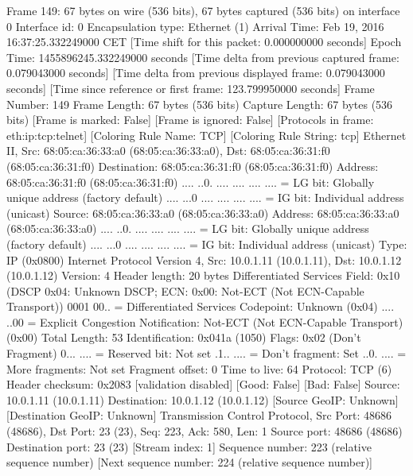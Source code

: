 Frame 149: 67 bytes on wire (536 bits), 67 bytes captured (536 bits) on interface 0
    Interface id: 0
    Encapsulation type: Ethernet (1)
    Arrival Time: Feb 19, 2016 16:37:25.332249000 CET
    [Time shift for this packet: 0.000000000 seconds]
    Epoch Time: 1455896245.332249000 seconds
    [Time delta from previous captured frame: 0.079043000 seconds]
    [Time delta from previous displayed frame: 0.079043000 seconds]
    [Time since reference or first frame: 123.799950000 seconds]
    Frame Number: 149
    Frame Length: 67 bytes (536 bits)
    Capture Length: 67 bytes (536 bits)
    [Frame is marked: False]
    [Frame is ignored: False]
    [Protocols in frame: eth:ip:tcp:telnet]
    [Coloring Rule Name: TCP]
    [Coloring Rule String: tcp]
Ethernet II, Src: 68:05:ca:36:33:a0 (68:05:ca:36:33:a0), Dst: 68:05:ca:36:31:f0 (68:05:ca:36:31:f0)
    Destination: 68:05:ca:36:31:f0 (68:05:ca:36:31:f0)
        Address: 68:05:ca:36:31:f0 (68:05:ca:36:31:f0)
        .... ..0. .... .... .... .... = LG bit: Globally unique address (factory default)
        .... ...0 .... .... .... .... = IG bit: Individual address (unicast)
    Source: 68:05:ca:36:33:a0 (68:05:ca:36:33:a0)
        Address: 68:05:ca:36:33:a0 (68:05:ca:36:33:a0)
        .... ..0. .... .... .... .... = LG bit: Globally unique address (factory default)
        .... ...0 .... .... .... .... = IG bit: Individual address (unicast)
    Type: IP (0x0800)
Internet Protocol Version 4, Src: 10.0.1.11 (10.0.1.11), Dst: 10.0.1.12 (10.0.1.12)
    Version: 4
    Header length: 20 bytes
    Differentiated Services Field: 0x10 (DSCP 0x04: Unknown DSCP; ECN: 0x00: Not-ECT (Not ECN-Capable Transport))
        0001 00.. = Differentiated Services Codepoint: Unknown (0x04)
        .... ..00 = Explicit Congestion Notification: Not-ECT (Not ECN-Capable Transport) (0x00)
    Total Length: 53
    Identification: 0x041a (1050)
    Flags: 0x02 (Don't Fragment)
        0... .... = Reserved bit: Not set
        .1.. .... = Don't fragment: Set
        ..0. .... = More fragments: Not set
    Fragment offset: 0
    Time to live: 64
    Protocol: TCP (6)
    Header checksum: 0x2083 [validation disabled]
        [Good: False]
        [Bad: False]
    Source: 10.0.1.11 (10.0.1.11)
    Destination: 10.0.1.12 (10.0.1.12)
    [Source GeoIP: Unknown]
    [Destination GeoIP: Unknown]
Transmission Control Protocol, Src Port: 48686 (48686), Dst Port: 23 (23), Seq: 223, Ack: 580, Len: 1
    Source port: 48686 (48686)
    Destination port: 23 (23)
    [Stream index: 1]
    Sequence number: 223    (relative sequence number)
    [Next sequence number: 224    (relative sequence number)]
